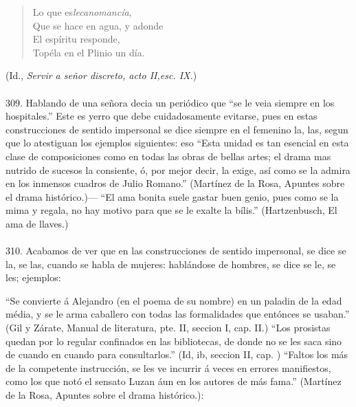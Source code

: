 \documentclass{article}
\begin{document}
\begin{verse}
Lo que es\emph{lecanomancía}, \\
Que se hace en agua, y adonde \\
El espíritu responde, \\
Topéla en el Plinio un día.
\end{verse}
\begin{flushright}
(Id., \emph{Servir a señor discreto, acto II,esc. IX.})
\end{flushright}

\normalsize

\paragraph{} 309. Hablando de una señora decia un periódico que “se le veia siempre en los hospitales.” Este es 
yerro que debe cuidadosamente evitarse, pues en estas construcciones de sentido impersonal se dice siempre en el 
femenino la, las, segun que lo atestiguan los ejemplos siguientes:
eso
``Esta unidad es tan esencial en esta clase de composiciones como en todas las obras de bellas artes; el drama 
mas nutrido de sucesos la consiente, ó, por mejor decir, la exige, así como se la admira en los inmensos cuadros 
de Julio Romano.'' (Martínez de la Rosa, Apuntes sobre el drama histórico.)--- ``El  ama bonita suele gastar 
buen genio, pues como se la mima y regala, no hay motivo para que se le exalte la bílis.'' (Hartzenbusch, El ama 
de llaves.)

\paragraph{} 310. Acabamos de ver que en las construcciones de sentido impersonal, se dice se la, se las, cuando 
se habla de mujeres: hablándose de hombres, se dice se le, se les; ejemplos:

“Se convierte á Alejandro (en el poema de su nombre) en un paladin de la edad média, y se le arma caballero con 
todas las formalidades que entónces se usaban.” (Gil y Zárate, Manual de literatura, pte. II, seccion I, cap. 
II.) “Los prosistas quedan por lo regular confinados en las bibliotecas, de donde no se les saca sino de cuando 
en cuando para consultarlos.” (Id, ib, seccion II, cap. ) “Faltos los más de la competente instrucción, se les 
ve incurrir á veces en errores manifiestos, como los que notó el sensato Luzan áun en los autores de más fama.” 
(Martínez de la Rosa, Apuntes sobre el drama histórico.): 
\end{document}
